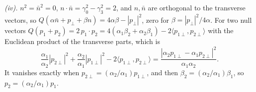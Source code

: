 \emph{(iv).} $n^{2} = \bar n^{2} = 0$, $n\cdot\bar n = \gamma_{0}^{2} - \gamma_{3}^{2} = 2$, and $n, \bar n$ are orthogonal to the transverse vectors, so $Q(\alpha\bar n + p_{\perp} + \beta n) = 4\alpha\beta - |p_{\perp}|^{2}$, zero for $\beta = |p_{\perp}|^{2}/4\alpha$. For two null vectors $Q(p_{1} + p_{2}) = 2\,p_{1}\cdot p_{2} = 4(\alpha_{1}\beta_{2} + \alpha_{2}\beta_{1}) - 2\langle p_{1\perp}, p_{2\perp}\rangle$ with the Euclidean product of the transverse parts, which is
\[
\frac{\alpha_{1}}{\alpha_{2}}|p_{2\perp}|^{2} + \frac{\alpha_{2}}{\alpha_{1}}|p_{1\perp}|^{2} - 2\langle p_{1\perp}, p_{2\perp}\rangle = \frac{|\alpha_{2}p_{1\perp} - \alpha_{1}p_{2\perp}|^{2}}{\alpha_{1}\alpha_{2}} .
\]
It vanishes exactly when $p_{2\perp} = (\alpha_{2}/\alpha_{1})p_{1\perp}$, and then $\beta_{2} = (\alpha_{2}/\alpha_{1})\beta_{1}$, so $p_{2} = (\alpha_{2}/\alpha_{1})p_{1}$.


